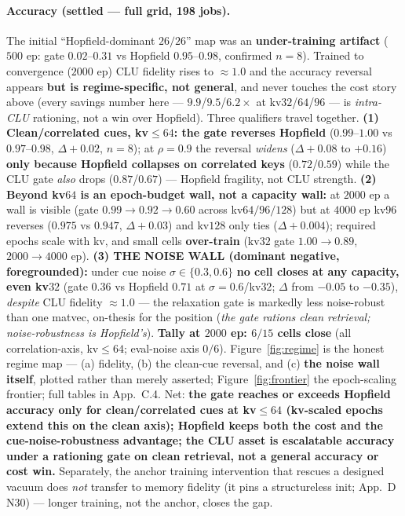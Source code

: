 \documentclass[11pt]{article}
\begin{document}
\paragraph{Accuracy (settled --- full grid, 198 jobs).} The initial ``Hopfield-dominant $26/26$'' map was an \textbf{under-training artifact} ($500$ ep: gate $0.02$--$0.31$ vs Hopfield $0.95$--$0.98$, confirmed $n=8$). Trained to convergence ($2000$ ep) CLU fidelity rises to $\approx1.0$ and the accuracy reversal appears \textbf{but is regime-specific, not general}, and never touches the cost story above (every savings number here --- $9.9$/$9.5$/$6.2\times$ at kv$32$/$64$/$96$ --- is \emph{intra-CLU} rationing, not a win over Hopfield). Three qualifiers travel together. \textbf{(1) Clean/correlated cues, kv$\le64$: the gate reverses Hopfield} ($0.99$--$1.00$ vs $0.97$--$0.98$, $\Delta+0.02$, $n=8$); at $\rho=0.9$ the reversal \emph{widens} ($\Delta+0.08$ to $+0.16$) \textbf{only because Hopfield collapses on correlated keys} ($0.72$/$0.59$) while the CLU gate \emph{also} drops ($0.87$/$0.67$) --- Hopfield fragility, not CLU strength. \textbf{(2) Beyond kv$64$ is an epoch-budget wall, not a capacity wall:} at $2000$ ep a wall is visible (gate $0.99\to0.92\to0.60$ across kv$64/96/128$) but at $4000$ ep kv$96$ reverses ($0.975$ vs $0.947$, $\Delta+0.03$) and kv$128$ only ties ($\Delta+0.004$); required epochs scale with kv, and small cells \textbf{over-train} (kv$32$ gate $1.00\to0.89$, $2000\to4000$ ep). \textbf{(3) THE NOISE WALL (dominant negative, foregrounded):} under cue noise $\sigma\in\{0.3,0.6\}$ \textbf{no cell closes at any capacity, even kv$32$} (gate $0.36$ vs Hopfield $0.71$ at $\sigma{=}0.6$/kv$32$; $\Delta$ from $-0.05$ to $-0.35$), \emph{despite} CLU fidelity $\approx1.0$ --- the relaxation gate is markedly less noise-robust than one matvec, on-thesis for the position (\emph{the gate rations clean retrieval; noise-robustness is Hopfield's}). \textbf{Tally at $2000$ ep: $6/15$ cells close} (all correlation-axis, kv$\le64$; eval-noise axis $0/6$). Figure~\ref{fig:regime} is the honest regime map --- (a) fidelity, (b) the clean-cue reversal, and (c) \textbf{the noise wall itself}, plotted rather than merely asserted; Figure~\ref{fig:frontier} the epoch-scaling frontier; full tables in App.~C.4. Net: \textbf{the gate reaches or exceeds Hopfield accuracy only for clean/correlated cues at kv$\le64$ (kv-scaled epochs extend this on the clean axis); Hopfield keeps both the cost and the cue-noise-robustness advantage; the CLU asset is escalatable accuracy under a rationing gate on clean retrieval, not a general accuracy or cost win.} Separately, the anchor training intervention that rescues a designed vacuum does \emph{not} transfer to memory fidelity (it pins a structureless init; App.~D N30) --- longer training, not the anchor, closes the gap.
\end{document}
